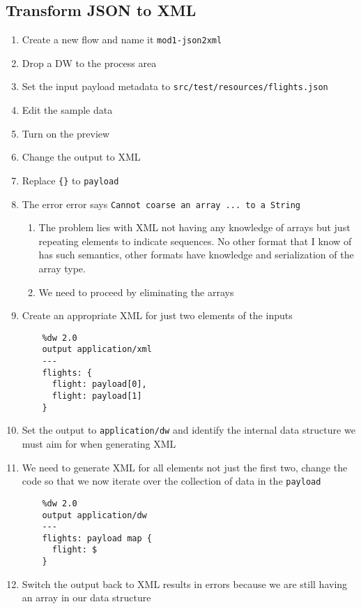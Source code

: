 \subsection{Transform JSON to XML}
\begin{enumerate}[resume*]

\item Create a new flow and name it \texttt{mod1-json2xml}
\item Drop a DW to the process area
\item Set the input payload metadata to \texttt{src/test/resources/flights.json}
\item Edit the sample data
\item Turn on the preview
\item Change the output to XML
\item Replace \texttt{\{\}} to \texttt{payload}
\item The error error says \texttt{Cannot coarse an array ... to a String}
  \begin{enumerate}
  \item The problem lies with XML not having any knowledge of arrays but just repeating elements to indicate sequences.  No other format that I know of has such semantics, other formats have knowledge and serialization of the array type.
  \item We need to proceed by eliminating the arrays
  \end{enumerate}
\item Create an appropriate XML for just two elements of the inputs
  \lstset{language=dw}
  \begin{lstlisting}
    %dw 2.0
    output application/xml
    ---
    flights: {
      flight: payload[0],
      flight: payload[1]
    }
  \end{lstlisting}
\item Set the output to \texttt{application/dw} and identify the internal data structure we must aim for when generating XML
\item We need to generate XML for all elements not just the first two, change the code so that we now iterate over the collection of data in the \texttt{payload}
  \begin{lstlisting}
    %dw 2.0
    output application/dw
    ---
    flights: payload map {
      flight: $
    }
  \end{lstlisting}
\item Switch the output back to XML results in errors because we are still having an array in our data structure

\end{enumerate}
